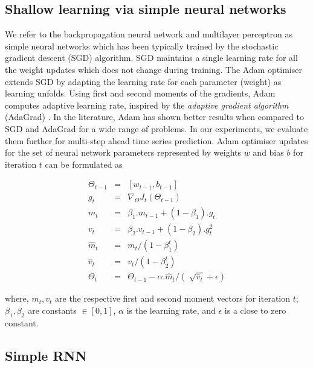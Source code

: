 \documentclass{ieeeaccess}
\begin{document}
 \subsection{Shallow learning via simple neural networks }
    
We refer to \textcolor{black}{the} backpropagation neural network and \textcolor{black}{multilayer perceptron}  as simple neural networks which has been typically trained by the stochastic gradient descent (SGD) algorithm. SGD maintains a single learning rate for all \textcolor{black}{the} weight updates which does not change during training. 
 The Adam optimiser \cite{kingma2014adam} extends  SGD by adapting the learning rate  for each parameter (weight)  as learning unfolds. Using first and second moments of the gradients, Adam computes adaptive learning rate, inspired by the \textit{adaptive gradient algorithm} (AdaGrad) \cite{duchi2011adaptive}.  In the literature, Adam has shown better results when compared to SGD and AdaGrad for a wide range of problems. In our experiments, we evaluate them further for multi-step ahead time series prediction.  Adam \textcolor{black}{optimiser updates} for the set of neural network parameters represented  by weights $w$ and bias $b$ for iteration   $t$ can be formulated as

\begin{eqnarray}
\Theta_{t-1}&=&[{w_{t-1},b_{t-1}}]\nonumber\\
g_t &=& \nabla_{\Theta}J_t(\Theta_{t-1})\nonumber\\
m_t &=& \beta_1.m_{t-1} + (1-\beta_1).g_t\nonumber\\
v_t &=& \beta_2.v_{t-1} + (1-\beta_2).g_t^2\nonumber\\
\hat{m}_t &=& m_t/(1-\beta^t_1)\nonumber\\
\hat{v}_t &=& v_t/(1-\beta^t_2)\nonumber\\
\Theta_t &=& \Theta_{t-1} -  \alpha.\hat{m}_t/(\sqrt[]{\hat{v}_t} + \epsilon)
\end{eqnarray}

 where, $m_t, v_t$ are the respective first  and second  moment vectors for iteration $t$; $\beta_1, \beta_2$ are constants $\in [0,1]$, $\alpha$ is the learning rate, and $\epsilon$ is a close to zero constant. 

  
 
 \subsection{Simple RNN}
 
\end{document}
